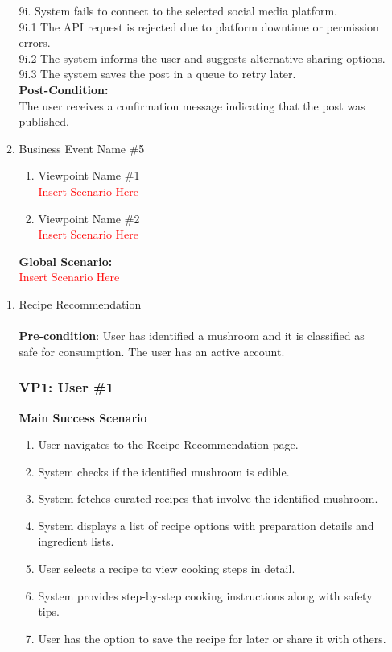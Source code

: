 \documentclass[]{article}
\begin{document}
\begin{enumerate}[{\bf BE1.}]
\begin{enumerate}[{\bf BE2.}]
	9i. System fails to connect to the selected social media platform.\\
	9i.1 The API request is rejected due to platform downtime or permission errors.\\
	9i.2 The system informs the user and suggests alternative sharing options.\\
	9i.3 The system saves the post in a queue to retry later.\\
	
	\textbf{Post-Condition:}\\
	The user receives a confirmation message indicating that the post was published.

	\item Business Event Name \#5
	\begin{enumerate}[{\bf VP1.}]
		\item Viewpoint Name \#1 \\
		\textcolor{red}{Insert Scenario Here}
		\item Viewpoint Name \#2 \\
		\textcolor{red}{Insert Scenario Here}
	\end{enumerate}
	{\bf Global Scenario:}\\
	\textcolor{red}{Insert Scenario Here}
\end{enumerate}

\begin{enumerate}[{\bf BE3.}]
    \item Recipe Recommendation \\
    \\
    \textbf{Pre-condition}: User has identified a mushroom and it is classified as safe for consumption. The user has an active account.
    \begin{enumerate}[{\bf VP1.}]
		\subsubsection*{VP1: User \#1}
		\textbf{Main Success Scenario}
		\begin{enumerate}
			\item User navigates to the Recipe Recommendation page.
			\item System checks if the identified mushroom is edible.
			\item System fetches curated recipes that involve the identified mushroom.
			\item System displays a list of recipe options with preparation details and ingredient lists.
			\item User selects a recipe to view cooking steps in detail.
			\item System provides step-by-step cooking instructions along with safety tips.
			\item User has the option to save the recipe for later or share it with others.
		\end{enumerate}
		

\end{enumerate}
\end{enumerate}
\end{enumerate}
\end{document}
